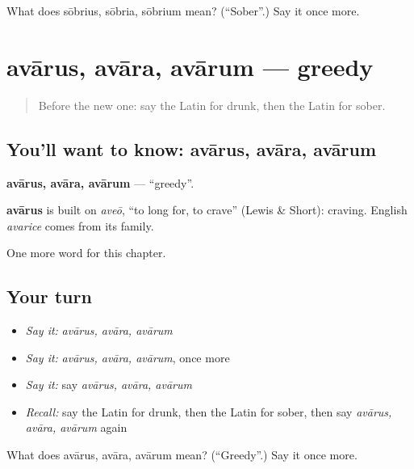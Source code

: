 \begin{tcolorbox}[breakable,colback=teal!4,colframe=teal!35!black,title={Before you move on}]
What does sōbrius, sōbria, sōbrium mean? (\textquotedblleft{}Sober\textquotedblright{}.) Say it once more.
\end{tcolorbox}
\section[avārus, avāra, avārum]{avārus, avāra, avārum — greedy}

\label{lesson:LA-C269-avarus}



\begin{quote}
Before the new one: say the Latin for drunk, then the Latin for sober.
\end{quote}

\subsection*{You'll want to know: avārus, avāra, avārum}
\textbf{avārus, avāra, avārum} — \textquotedblleft{}greedy\textquotedblright{}.

\begin{cousinweb}
\textbf{avārus} is built on \emph{aveō}, \textquotedblleft{}to long for, to crave\textquotedblright{} (Lewis \& Short): craving. English \emph{avarice} comes from its family.
\end{cousinweb}

\begin{grammarlens}[title={What you've built}]
One more word for this chapter.
\end{grammarlens}

\subsection*{Your turn}
\begin{itemize}
\raggedright
  \item \emph{Say it:} \emph{avārus, avāra, avārum}
  \item \emph{Say it:} \emph{avārus, avāra, avārum}, once more
  \item \emph{Say it:} say \emph{avārus, avāra, avārum}
  \item \emph{Recall:} say the Latin for drunk, then the Latin for sober, then say \emph{avārus, avāra, avārum} again
\end{itemize}

\begin{tcolorbox}[breakable,colback=teal!4,colframe=teal!35!black,title={Before you move on}]
What does avārus, avāra, avārum mean? (\textquotedblleft{}Greedy\textquotedblright{}.) Say it once more.
\end{tcolorbox}
